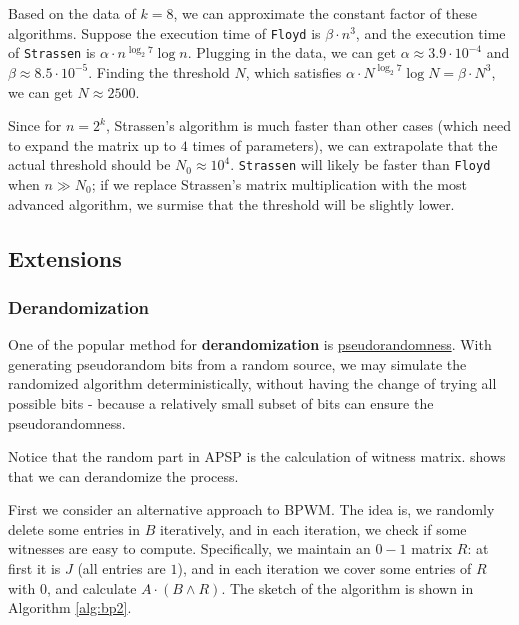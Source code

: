 \documentclass[11pt]{article}
\theoremstyle{plain}
\begin{document}
Based on the data of $k=8$, we can approximate the constant factor of these algorithms. Suppose the execution time of \texttt{Floyd} is $\beta\cdot n^3$, and the execution time of \texttt{Strassen} is $\alpha\cdot n^{\log_2 7}\log n$. Plugging in the data, we can get $\alpha\approx 3.9\cdot 10^{-4}$ and $\beta\approx 8.5\cdot 10^{-5}$. Finding the threshold $N$, which satisfies $\alpha\cdot N^{\log_2 7}\log N=\beta\cdot N^3$, we can get $N\approx 2500$. 

Since for $n=2^k$, Strassen's algorithm is much faster than other cases (which need to expand the matrix up to $4$ times of parameters), we can extrapolate that the actual threshold should be $N_0\approx 10^4$. \texttt{Strassen} will likely be faster than \texttt{Floyd} when $n\gg N_0$; if we replace Strassen's matrix multiplication with the most advanced algorithm, we surmise that the threshold will be slightly lower.

\subsection{Extensions}

\subsubsection{Derandomization}

One of the popular method for \textbf{derandomization} is \underline{pseudorandomness}. With generating pseudorandom bits from a random source, we may simulate the randomized algorithm deterministically, without having the change of trying all possible bits - because a relatively small subset of bits can ensure the pseudorandomness.

Notice that the random part in APSP is the calculation of witness matrix. \cite{267748} shows that we can derandomize the process. 

First we consider an alternative approach to BPWM. The idea is, we randomly delete some entries in $B$ iteratively, and in each iteration, we check if some witnesses are easy to compute. Specifically, we maintain an $0-1$ matrix $R$: at first it is $J$ (all entries are $1$), and in each iteration we cover some entries of $R$ with $0$, and calculate $A\cdot (B\land R)$. The sketch of the algorithm is shown in Algorithm \ref{alg:bp2}.
\end{document}
